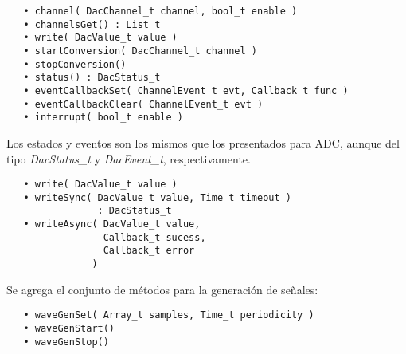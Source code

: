 \begin{verbatim}
   • channel( DacChannel_t channel, bool_t enable )
   • channelsGet() : List_t
   • write( DacValue_t value )
   • startConversion( DacChannel_t channel )
   • stopConversion()
   • status() : DacStatus_t
   • eventCallbackSet( ChannelEvent_t evt, Callback_t func )
   • eventCallbackClear( ChannelEvent_t evt )
   • interrupt( bool_t enable )
\end{verbatim}

Los estados y eventos son los mismos que los presentados para ADC, aunque del tipo \emph{DacStatus\_t} y \emph{DacEvent\_t}, respectivamente.


\begin{verbatim}
   • write( DacValue_t value )
   • writeSync( DacValue_t value, Time_t timeout ) 
                : DacStatus_t
   • writeAsync( DacValue_t value, 
                 Callback_t sucess, 
                 Callback_t error 
               )
\end{verbatim}

Se agrega el conjunto de métodos para la generación de señales:

\begin{verbatim}
   • waveGenSet( Array_t samples, Time_t periodicity )
   • waveGenStart()
   • waveGenStop()
\end{verbatim}
